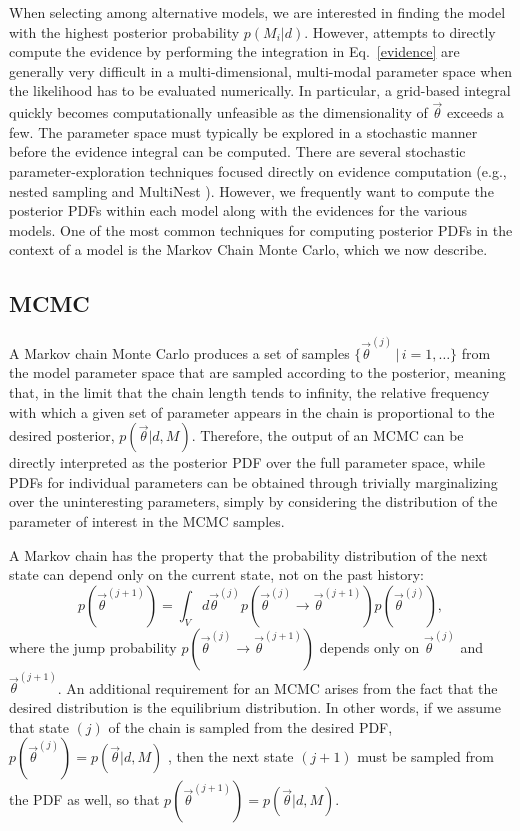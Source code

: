 \documentclass[prd,preprint]{revtex4}
\newcommand{\vtheta}{\vec{\theta}}
\newcommand{\be}{\begin{equation}}
\newcommand{\ee}{\end{equation}}
\begin{document}
When selecting among alternative models, we are interested in finding
the model with the highest posterior probability $p(M_i|d)$.  However,
attempts to directly compute the evidence by performing the
integration in Eq.~\eqref{evidence} are generally very difficult in a
multi-dimensional, multi-modal parameter space when the likelihood has
to be evaluated numerically.  In particular, a grid-based integral
quickly becomes computationally unfeasible as the dimensionality of
$\vtheta$ exceeds a few.  The parameter space must typically be
explored in a stochastic manner before the evidence integral can be
computed.  There are several stochastic parameter-exploration
techniques focused directly on evidence computation (e.g., nested
sampling \cite{Skilling:2006} and MultiNest \cite{Feroz:2009}).  However, we
frequently want to compute the posterior PDFs within each model along
with the evidences for the various models.  One of the most common
techniques for computing posterior PDFs in the context of a model is
the Markov Chain Monte Carlo, which we now describe.

\subsection{MCMC} \label{sec:mcmc}

A Markov chain Monte Carlo \cite{Gilks:1996} produces a set of samples $\{ \vtheta^{(j)} \, | \, i = 1, \ldots \}$ from the model parameter space that are sampled according to the posterior, meaning that, in the limit that the chain length tends to infinity, the relative frequency with which a given set of parameter appears in the chain is proportional to the desired posterior, $p(\vtheta|d,M)$.  Therefore, the output of an MCMC can be directly interpreted as the posterior PDF over the full parameter space, while PDFs for individual parameters can be obtained through trivially marginalizing over the uninteresting parameters, simply by considering the distribution of the parameter of interest in the MCMC samples.

A Markov chain has the property that the probability distribution of the next state can depend only on the current state, not on the past history:
\be
p(\vtheta^{(j+1)})=\int_{V} d\vtheta^{(j)} p(\vtheta^{(j)} \to \vtheta^{(j+1)}) p(\vtheta^{(j)}),
\ee
where the jump probability $p(\vtheta^{(j)} \to \vtheta^{(j+1)})$ depends only on $\vtheta^{(j)}$ and $\vtheta^{(j+1)}$. 
An additional requirement for an MCMC arises from the fact that the desired distribution is the equilibrium distribution.  In other words, if we assume that state $(j)$ of the chain is sampled from the desired PDF, $p(\vtheta^{(j)})=p(\vtheta|d,M)$ , then the next state $(j+1)$ must be sampled from the PDF as well, so that $p(\vtheta^{(j+1)})=p(\vtheta|d,M)$.  
\end{document}
